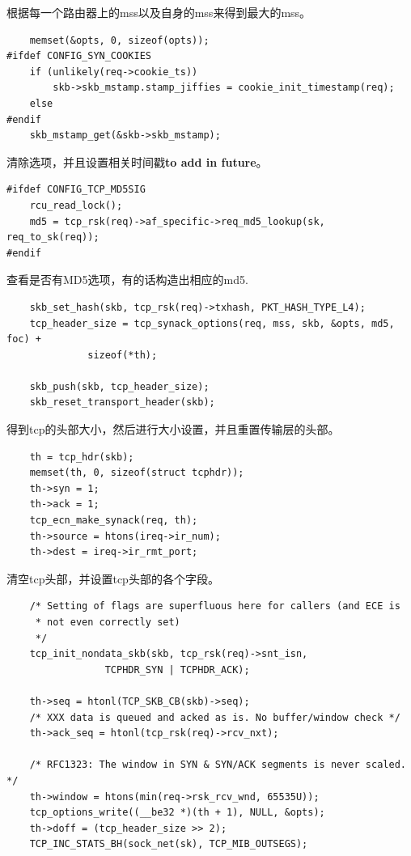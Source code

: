                 根据每一个路由器上的mss以及自身的mss来得到最大的mss。
\begin{verbatim}
    memset(&opts, 0, sizeof(opts));
#ifdef CONFIG_SYN_COOKIES
    if (unlikely(req->cookie_ts))
        skb->skb_mstamp.stamp_jiffies = cookie_init_timestamp(req);
    else
#endif
    skb_mstamp_get(&skb->skb_mstamp);
\end{verbatim}

                清除选项，并且设置相关时间戳\textbf{to add in future}。

\begin{verbatim}
#ifdef CONFIG_TCP_MD5SIG
    rcu_read_lock();
    md5 = tcp_rsk(req)->af_specific->req_md5_lookup(sk, req_to_sk(req));
#endif
\end{verbatim}

                查看是否有MD5选项，有的话构造出相应的md5.

\begin{verbatim}
    skb_set_hash(skb, tcp_rsk(req)->txhash, PKT_HASH_TYPE_L4);
    tcp_header_size = tcp_synack_options(req, mss, skb, &opts, md5, foc) +
              sizeof(*th);

    skb_push(skb, tcp_header_size);
    skb_reset_transport_header(skb);
\end{verbatim}

                得到tcp的头部大小，然后进行大小设置，并且重置传输层的头部。

\begin{verbatim}
    th = tcp_hdr(skb);
    memset(th, 0, sizeof(struct tcphdr));
    th->syn = 1;
    th->ack = 1;
    tcp_ecn_make_synack(req, th);
    th->source = htons(ireq->ir_num);
    th->dest = ireq->ir_rmt_port;
\end{verbatim}

                清空tcp头部，并设置tcp头部的各个字段。

\begin{verbatim}
    /* Setting of flags are superfluous here for callers (and ECE is
     * not even correctly set)
     */
    tcp_init_nondata_skb(skb, tcp_rsk(req)->snt_isn,
                 TCPHDR_SYN | TCPHDR_ACK);

    th->seq = htonl(TCP_SKB_CB(skb)->seq);
    /* XXX data is queued and acked as is. No buffer/window check */
    th->ack_seq = htonl(tcp_rsk(req)->rcv_nxt);

    /* RFC1323: The window in SYN & SYN/ACK segments is never scaled. */
    th->window = htons(min(req->rsk_rcv_wnd, 65535U));
    tcp_options_write((__be32 *)(th + 1), NULL, &opts);
    th->doff = (tcp_header_size >> 2);
    TCP_INC_STATS_BH(sock_net(sk), TCP_MIB_OUTSEGS);
\end{verbatim}


